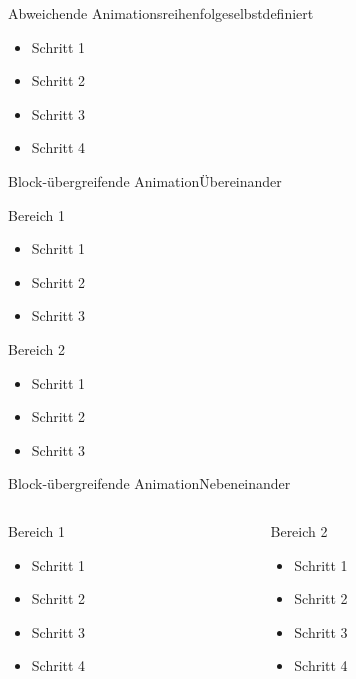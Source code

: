 \documentclass[t,aspectratio=169,dvipsnames]{beamer}
\begin{document}
\begin{frame}{Abweichende Animationsreihenfolge}{selbstdefiniert}
\begin{itemize}
	\item<1,3> Schritt 1
	\item<2-> Schritt 2
	\item<3-4> Schritt 3
	\item<5> Schritt 4
\end{itemize}
\end{frame}

\begin{frame}{Block-übergreifende Animation}{Übereinander}
\begin{block}{Bereich 1}
	\begin{itemize}
		\item<1-> Schritt 1
		\item<3-> Schritt 2
		\item<5-> Schritt 3
	\end{itemize}
\end{block}
\begin{block}{Bereich 2}
	\begin{itemize}
		\item<2-> Schritt 1
		\item<4-> Schritt 2
		\item<6-> Schritt 3
	\end{itemize}
\end{block}
\end{frame}

\begin{frame}{Block-übergreifende Animation}{Nebeneinander}
\begin{columns}[T]
\begin{column}[T]{0.5\textwidth}
\begin{block}{Bereich 1}
	\begin{itemize}
		\item<1-> Schritt 1
		\item<3-> Schritt 2
		\item<5-> Schritt 3
		\item<6-> Schritt 4
	\end{itemize}
\end{block}
\end{column}
\begin{column}[T]{0.5\textwidth}
\begin{block}{Bereich 2}
	\begin{itemize}
		\item<2-> Schritt 1
		\item<4-> Schritt 2
		\item<7-> Schritt 3
		\item<8-> Schritt 4
	\end{itemize}
\end{block}
\end{column}
\end{columns}
\end{frame}
\end{document}
